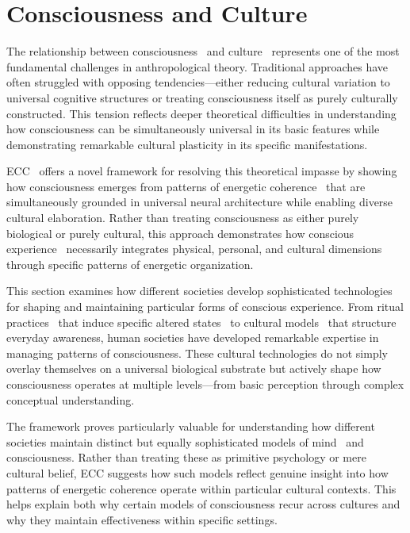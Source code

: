 \section{Consciousness and Culture}


The relationship between consciousness~ and culture~ represents one of the most fundamental challenges in anthropological theory. Traditional approaches have often struggled with opposing tendencies---either reducing cultural variation to universal cognitive structures or treating consciousness itself as purely culturally constructed. This tension reflects deeper theoretical difficulties in understanding how consciousness can be simultaneously universal in its basic features while demonstrating remarkable cultural plasticity in its specific manifestations.

ECC~ offers a novel framework for resolving this theoretical impasse by showing how consciousness emerges from patterns of energetic coherence~ that are simultaneously grounded in universal neural architecture while enabling diverse cultural elaboration. Rather than treating consciousness as either purely biological or purely cultural, this approach demonstrates how conscious experience~ necessarily integrates physical, personal, and cultural dimensions through specific patterns of energetic organization.

This section examines how different societies develop sophisticated technologies for shaping and maintaining particular forms of conscious experience. From ritual practices~ that induce specific altered states~ to cultural models~ that structure everyday awareness, human societies have developed remarkable expertise in managing patterns of consciousness. These cultural technologies do not simply overlay themselves on a universal biological substrate but actively shape how consciousness operates at multiple levels---from basic perception through complex conceptual understanding.

The framework proves particularly valuable for understanding how different societies maintain distinct but equally sophisticated models of mind~ and consciousness. Rather than treating these as primitive psychology or mere cultural belief, ECC suggests how such models reflect genuine insight into how patterns of energetic coherence operate within particular cultural contexts. This helps explain both why certain models of consciousness recur across cultures and why they maintain effectiveness within specific settings.

